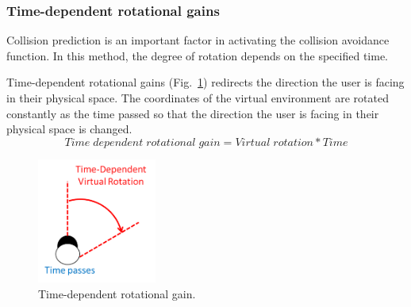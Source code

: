 \subsubsection{Time-dependent rotational gains}
Collision prediction is an important factor in activating the collision avoidance function. In this method, the degree of rotation depends on the specified time.

Time-dependent rotational gains (Fig.~\ref{fig:T2DGain}) redirects the direction the user is facing in their physical space. The coordinates of the virtual environment are rotated constantly as the time passed so that the direction the user is facing in their physical space is changed.
\[
Time\;dependent\;rotational\;gain = Virtual\;rotation * Time
 \]
\begin{figure}[H]\centering
	\includegraphics[width=0.35\textwidth]{Pictures/TimeDependentRotationGain.png}%
	\caption{Time-dependent rotational gain.}\label{fig:T2DGain}%
\end{figure}
\newpage
